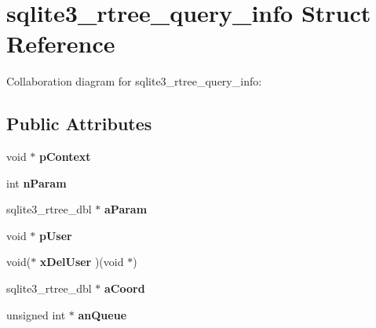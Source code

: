 \hypertarget{structsqlite3__rtree__query__info}{}\section{sqlite3\+\_\+rtree\+\_\+query\+\_\+info Struct Reference}
\label{structsqlite3__rtree__query__info}


Collaboration diagram for sqlite3\+\_\+rtree\+\_\+query\+\_\+info\+:
\subsection*{Public Attributes}
\begin{DoxyCompactItemize}
\item 
void $\ast$ {\bfseries p\+Context}\hypertarget{structsqlite3__rtree__query__info_a7b6167ce5f7bbccffbfa1c57bf5a29d9}{}\label{structsqlite3__rtree__query__info_a7b6167ce5f7bbccffbfa1c57bf5a29d9}

\item 
int {\bfseries n\+Param}\hypertarget{structsqlite3__rtree__query__info_a9df4acb109f572455c8e2fb443027157}{}\label{structsqlite3__rtree__query__info_a9df4acb109f572455c8e2fb443027157}

\item 
sqlite3\+\_\+rtree\+\_\+dbl $\ast$ {\bfseries a\+Param}\hypertarget{structsqlite3__rtree__query__info_a8dec761b0488860396c021a5d1ca079f}{}\label{structsqlite3__rtree__query__info_a8dec761b0488860396c021a5d1ca079f}

\item 
void $\ast$ {\bfseries p\+User}\hypertarget{structsqlite3__rtree__query__info_a194519db635c0afe0667a25eafe35fdc}{}\label{structsqlite3__rtree__query__info_a194519db635c0afe0667a25eafe35fdc}

\item 
void($\ast$ {\bfseries x\+Del\+User} )(void $\ast$)\hypertarget{structsqlite3__rtree__query__info_a316a86ba7544e9388646fdd960052cd2}{}\label{structsqlite3__rtree__query__info_a316a86ba7544e9388646fdd960052cd2}

\item 
sqlite3\+\_\+rtree\+\_\+dbl $\ast$ {\bfseries a\+Coord}\hypertarget{structsqlite3__rtree__query__info_a25340b0dbf1d566172da1d71a4db1427}{}\label{structsqlite3__rtree__query__info_a25340b0dbf1d566172da1d71a4db1427}

\item 
unsigned int $\ast$ {\bfseries an\+Queue}\hypertarget{structsqlite3__rtree__query__info_a7ce9664e95ce7255b87d948986e311c9}{}\label{structsqlite3__rtree__query__info_a7ce9664e95ce7255b87d948986e311c9}


\end{DoxyCompactItemize}
